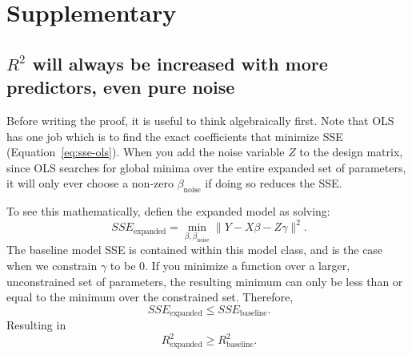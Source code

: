 \documentclass{article}
\begin{document}
\section{Supplementary}
\subsection{$R^2$ will always be increased with more predictors, even pure noise} \label{sec:supp-1}
Before writing the proof, it is useful to think algebraically first. Note that OLS has one job which is to find the exact coefficients that minimize SSE (Equation~\eqref{eq:sse-ols}). When you add the noise variable $Z$ to the design matrix, since OLS searches for global minima over the entire expanded set of parameters, it will only ever choose a non-zero $\beta_\text{noise}$ if doing so reduces the SSE.

To see this mathematically, defien the expanded model as solving:
\[
\  SSE_\text{expanded} = \min_{\beta, \beta_\text{noise}} \| Y - X\beta - Z\gamma \|^2.
\]
The baseline model SSE is contained within this model class, and is the case when we constrain $\gamma$ to be 0. If you minimize a function over a larger, unconstrained set of parameters, the resulting minimum can only be less than or equal to the minimum over the constrained set. Therefore,
\[
\  SSE_\text{expanded} \le SSE_\text{baseline}.
\]
Resulting in 
\[
\  R^2_\text{expanded} \ge R^2_\text{baseline}.
\]
\end{document}
